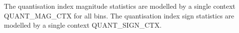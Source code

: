 The quantisation index magnitude statistics are modelled by a single
context QUANT\_MAG\_CTX for all bins. The quantisation index sign
statistics are modelled by a single context QUANT\_SIGN\_CTX.


